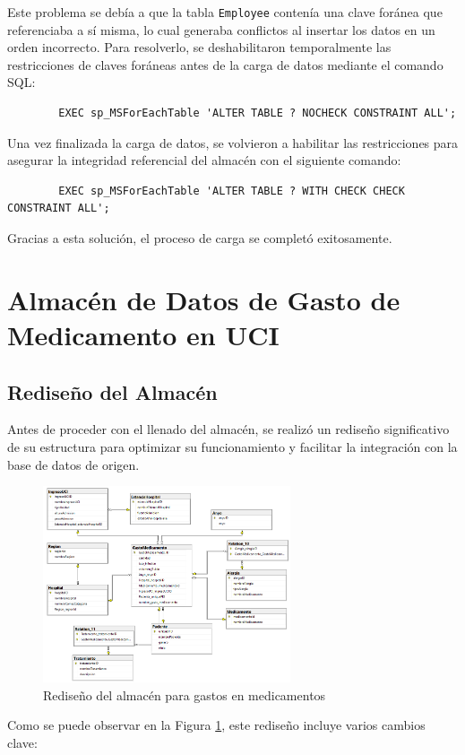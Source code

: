 \documentclass{article}
\begin{document}
	Este problema se debía a que la tabla \texttt{Employee} contenía una clave foránea que referenciaba a sí misma, lo cual generaba conflictos al insertar los datos en un orden incorrecto. Para resolverlo, se deshabilitaron temporalmente las restricciones de claves foráneas antes de la carga de datos mediante el comando SQL:
	
	\begin{verbatim}
		EXEC sp_MSForEachTable 'ALTER TABLE ? NOCHECK CONSTRAINT ALL';
	\end{verbatim}
	
	Una vez finalizada la carga de datos, se volvieron a habilitar las restricciones para asegurar la integridad referencial del almacén con el siguiente comando:
	
	\begin{verbatim}
		EXEC sp_MSForEachTable 'ALTER TABLE ? WITH CHECK CHECK CONSTRAINT ALL';
	\end{verbatim}
	
	Gracias a esta solución, el proceso de carga se completó exitosamente. 
	
	\section{Almacén de Datos de Gasto de Medicamento en UCI}
	
	\subsection{Rediseño del Almacén}
	
	Antes de proceder con el llenado del almacén, se realizó un rediseño significativo de su estructura para optimizar su funcionamiento y facilitar la integración con la base de datos de origen. 
	\begin{figure}[H]
		\begin{center} 
			\includegraphics[width=0.65\textwidth]{images/nuevo_diseno.png} %
			\caption{Rediseño del almacén para gastos en medicamentos}
			\label{fig:nuevo_diseño}
		\end{center}
	\end{figure}
	Como se puede observar en la Figura \ref{fig:nuevo_diseño}, este rediseño incluye varios cambios clave:
	
\end{document}
